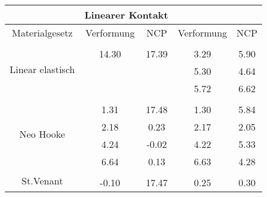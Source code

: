 \begin{table} 
\centering 
\begin{tabular}{c|cc|cc|} 
\cline{2-5} 
 & \multicolumn{2}{|c|}{Linearer Kontakt} &  \\ 
\hline 
\multicolumn{1}{|c|}{Materialgesetz} & \multicolumn{1}{c|}{Verformung} & \multicolumn{1}{c|}{NCP} & \multicolumn{1}{c|}{Verformung} & \multicolumn{1}{c|}{NCP} \\ 
\hline 
\multicolumn{1}{|c|}{\multirow{4}{*}{Linear elastisch}} &\multicolumn{1}{|c|}{} & \multicolumn{1}{|c|}{} & \multicolumn{1}{|c|}{} & \multicolumn{1}{|c|}{} \\ 
\multicolumn{1}{|c|}{} & \multicolumn{1}{|c|}{     14.30} & \multicolumn{1}{|c|}{     17.39} & \multicolumn{1}{|c|}{      3.29} & \multicolumn{1}{|c|}{      5.90} \\ 
\multicolumn{1}{|c|}{} & \multicolumn{1}{|c|}{} & \multicolumn{1}{|c|}{} & \multicolumn{1}{|c|}{      5.30} & \multicolumn{1}{|c|}{      4.64} \\ 
\multicolumn{1}{|c|}{} & \multicolumn{1}{|c|}{} & \multicolumn{1}{|c|}{} & \multicolumn{1}{|c|}{      5.72} & \multicolumn{1}{|c|}{      6.62} \\ 
\hline 
\multicolumn{1}{|c|}{\multirow{5}{*}{Neo Hooke}} &\multicolumn{1}{|c|}{} & \multicolumn{1}{|c|}{} & \multicolumn{1}{|c|}{} & \multicolumn{1}{|c|}{} \\ 
\multicolumn{1}{|c|}{} & \multicolumn{1}{|c|}{      1.31} & \multicolumn{1}{|c|}{     17.48} & \multicolumn{1}{|c|}{      1.30} & \multicolumn{1}{|c|}{      5.84} \\ 
\multicolumn{1}{|c|}{} & \multicolumn{1}{|c|}{      2.18} & \multicolumn{1}{|c|}{      0.23} & \multicolumn{1}{|c|}{      2.17} & \multicolumn{1}{|c|}{      2.05} \\ 
\multicolumn{1}{|c|}{} & \multicolumn{1}{|c|}{      4.24} & \multicolumn{1}{|c|}{     -0.02} & \multicolumn{1}{|c|}{      4.22} & \multicolumn{1}{|c|}{      5.33} \\ 
\multicolumn{1}{|c|}{} & \multicolumn{1}{|c|}{      6.64} & \multicolumn{1}{|c|}{      0.13} & \multicolumn{1}{|c|}{      6.63} & \multicolumn{1}{|c|}{      4.28} \\ 
\hline 
\multicolumn{1}{|c|}{\multirow{101}{*}{St.Venant}} &\multicolumn{1}{|c|}{} & \multicolumn{1}{|c|}{} & \multicolumn{1}{|c|}{} & \multicolumn{1}{|c|}{} \\ 
\multicolumn{1}{|c|}{} & \multicolumn{1}{|c|}{     -0.10} & \multicolumn{1}{|c|}{     17.47} & \multicolumn{1}{|c|}{      0.25} & \multicolumn{1}{|c|}{      0.30} \\ 

\end{tabular}
\end{table}
